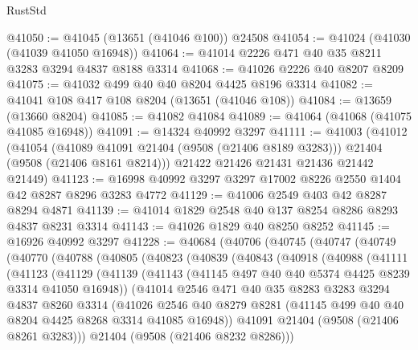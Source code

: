 \begin{lexlean}{RustStd}
\begin{coremodule}
@41050 := @41045 (@13651 (@41046 @100)) @24508
@41054 := @41024 (@41030 (@41039 @41050 @16948))
@41064 := @41014 @2226 @471 @40 @35 @8211 @3283 @3294 @4837 @8188 @3314
@41068 := @41026 @2226 @40 @8207 @8209
@41075 := @41032 @499 @40 @40 @8204 @4425 @8196 @3314
@41082 := @41041 @108 @417 @108 @8204 (@13651 (@41046 @108))
@41084 := @13659 (@13660 @8204)
@41085 := @41082 @41084
@41089 := @41064 (@41068 (@41075 @41085 @16948))
@41091 := @14324 @40992 @3297
@41111 := @41003
    (@41012
      (@41054
        (@41089 @41091 @21404 (@9508 (@21406 @8189 @3283)))
        @21404
        (@9508 (@21406 @8161 @8214)))
      @21422
      @21426
      @21431
      @21436
      @21442
      @21449)
@41123 := @16998 @40992 @3297 @3297 @17002 @8226 @2550 @1404 @42 @8287 @8296 @3283 @4772
@41129 := @41006 @2549 @403 @42 @8287 @8294 @4871
@41139 := @41014 @1829 @2548 @40 @137 @8254 @8286 @8293 @4837 @8231 @3314
@41143 := @41026 @1829 @40 @8250 @8252
@41145 := @16926 @40992 @3297
@41228 := @40684
    (@40706
      (@40745
        (@40747
          (@40749
            (@40770
              (@40788
                (@40805
                  (@40823
                    (@40839
                      (@40843
                        (@40918
                          (@40988
                            (@41111
                              (@41123
                                (@41129
                                  (@41139
                                    (@41143
                                      (@41145 @497 @40 @40 @5374 @4425 @8239 @3314 @41050 @16948))
                                    (@41014
                                      @2546
                                      @471
                                      @40
                                      @35
                                      @8283
                                      @3283
                                      @3294
                                      @4837
                                      @8260
                                      @3314
                                      (@41026
                                        @2546
                                        @40
                                        @8279
                                        @8281
                                        (@41145 @499 @40 @40 @8204 @4425 @8268 @3314 @41085 @16948))
                                      @41091
                                      @21404
                                      (@9508 (@21406 @8261 @3283)))
                                    @21404
                                    (@9508 (@21406 @8232 @8286)))

\end{coremodule}
\end{lexlean}
